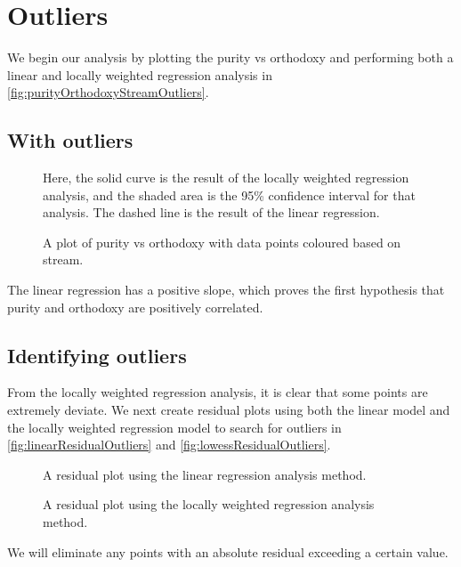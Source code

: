 \chapter{Outliers}\label{chap:outliers}

We begin our analysis by plotting the purity vs orthodoxy and performing both a linear and locally weighted regression analysis in \vref{fig:purityOrthodoxyStreamOutliers}.

\section{With outliers}
\begin{figure}[H]
	\caption{A plot of purity vs orthodoxy with data points coloured based on stream.}
	\label{fig:purityOrthodoxyStreamOutliers}
	Here, the solid curve is the result of the locally weighted regression analysis, and the shaded area is the 95\% confidence interval for that analysis.
	The dashed line is the result of the linear regression.
\end{figure}

The linear regression has a positive slope, which proves the first hypothesis that purity and orthodoxy are positively correlated.

\section{Identifying outliers}
From the locally weighted regression analysis, it is clear that some points are extremely deviate.
We next create residual plots using both the linear model and the locally weighted regression model to search for outliers in \vref{fig:linearResidualOutliers} and \vref{fig:lowessResidualOutliers}.

\begin{figure}[H]
	\caption{A residual plot using the linear regression analysis method.}
	\label{fig:linearResidualOutliers}
\end{figure}

\begin{figure}[H]
	\caption{A residual plot using the locally weighted regression analysis method.}
	\label{fig:lowessResidualOutliers}
\end{figure}

We will eliminate any points with an absolute residual exceeding a certain value.

